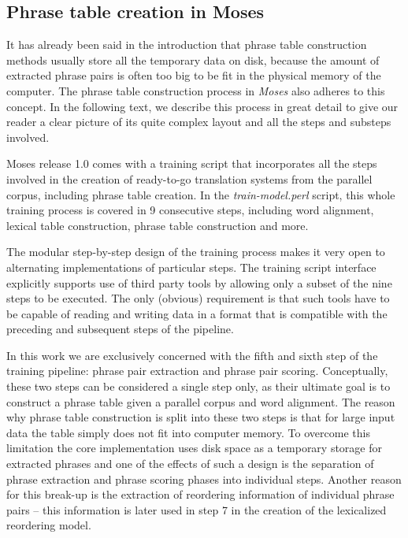 \subsection{Phrase table creation in Moses}
\label{sec:phrase-table-creation-in-moses}

It has already been said in the introduction that phrase table construction methods
usually store all the temporary data on disk, because the amount of extracted
phrase pairs is often too big to be fit in the physical memory of the computer.
The phrase table construction process in \emph{Moses} also adheres to this concept.
In the following text, we describe this process in great detail to give our reader
a clear picture of its quite complex layout and all the steps and substeps involved.

Moses release 1.0 comes
with a training script that incorporates all the steps involved in the creation of
ready-to-go translation systems from the parallel corpus, including phrase table creation.
In the \emph{train-model.perl} script, this whole training process is covered in
9 consecutive steps,
including word alignment, lexical table construction, phrase table construction and more.

The modular step-by-step design of the training process makes it very open to
alternating implementations of particular steps.
The training script interface explicitly supports use of third party tools by
allowing only a subset of the nine steps to be executed.
The only (obvious) requirement is that such tools have to be capable of reading and
writing data in a format that is compatible with the preceding and subsequent steps
of the pipeline.

In this work we are exclusively concerned with the fifth and sixth step of
the training pipeline:
phrase pair extraction
and phrase pair scoring.
Conceptually, these two steps can be considered a single step only, as their ultimate
goal is to construct a phrase table given a parallel corpus and word alignment.
The reason why phrase table construction is split into these two steps is that
for large input data the table simply does not fit into computer memory.
To overcome this limitation the core implementation uses disk space as a temporary storage
for extracted phrases and one of the effects of such a design is the separation of
phrase extraction and phrase scoring phases into individual steps.
Another reason for this break-up is the extraction of reordering information
of individual phrase pairs -- this information is later used in step 7 in the creation
of the lexicalized reordering model.

